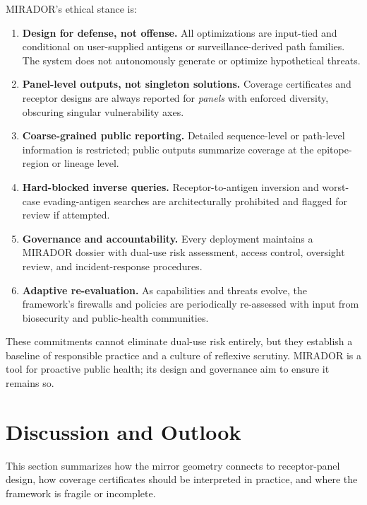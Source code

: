 \documentclass[11pt]{article}
\begin{document}
MIRADOR's ethical stance is:
\begin{enumerate}
  \item \textbf{Design for defense, not offense.}
  All optimizations are input-tied and conditional on user-supplied antigens or surveillance-derived
  path families. The system does not autonomously generate or optimize hypothetical threats.

  \item \textbf{Panel-level outputs, not singleton solutions.}
  Coverage certificates and receptor designs are always reported for \emph{panels} with enforced
  diversity, obscuring singular vulnerability axes.

  \item \textbf{Coarse-grained public reporting.}
  Detailed sequence-level or path-level information is restricted; public outputs summarize
  coverage at the epitope-region or lineage level.

  \item \textbf{Hard-blocked inverse queries.}
  Receptor-to-antigen inversion and worst-case evading-antigen searches are architecturally
  prohibited and flagged for review if attempted.

  \item \textbf{Governance and accountability.}
  Every deployment maintains a MIRADOR dossier with dual-use risk assessment, access control,
  oversight review, and incident-response procedures.

  \item \textbf{Adaptive re-evaluation.}
  As capabilities and threats evolve, the framework's firewalls and policies are periodically
  re-assessed with input from biosecurity and public-health communities.
\end{enumerate}

These commitments cannot eliminate dual-use risk entirely, but they establish a baseline of
responsible practice and a culture of reflexive scrutiny. MIRADOR is a tool for proactive public
health; its design and governance aim to ensure it remains so.

\section{Discussion and Outlook}
\label{sec:discussion}

This section summarizes how the mirror geometry connects to receptor-panel design, how coverage
certificates should be interpreted in practice, and where the framework is fragile or incomplete.
\end{document}
